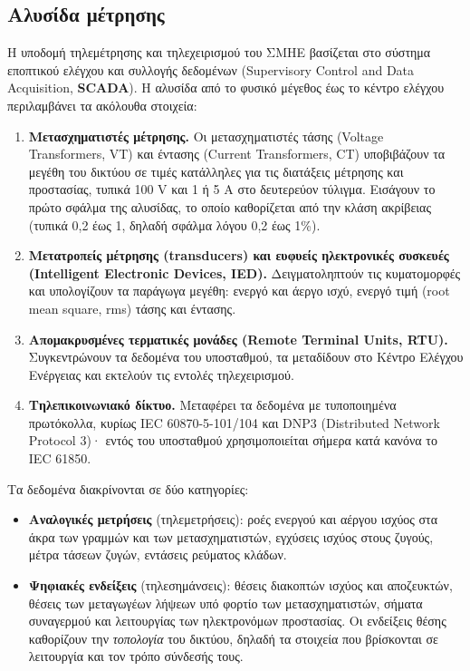 \subsection{Αλυσίδα μέτρησης}

Η υποδομή τηλεμέτρησης και τηλεχειρισμού του ΣΜΗΕ βασίζεται στο σύστημα εποπτικού ελέγχου
και συλλογής δεδομένων (Supervisory Control and Data Acquisition, \textbf{SCADA}). Η αλυσίδα
από το φυσικό μέγεθος έως το κέντρο ελέγχου περιλαμβάνει τα ακόλουθα στοιχεία:

\begin{enumerate}
\item \textbf{Μετασχηματιστές μέτρησης.} Οι μετασχηματιστές τάσης (Voltage Transformers, VT) και
      έντασης (Current Transformers, CT)
      υποβιβάζουν τα μεγέθη του δικτύου σε τιμές κατάλληλες για τις διατάξεις μέτρησης
      και προστασίας, τυπικά 100 V και 1 ή 5 A στο δευτερεύον τύλιγμα. Εισάγουν το πρώτο
      σφάλμα της αλυσίδας, το οποίο καθορίζεται από την κλάση ακρίβειας (τυπικά 0,2 έως 1,
      δηλαδή σφάλμα λόγου 0,2 έως 1\%).
\item \textbf{Μετατροπείς μέτρησης (transducers) και ευφυείς ηλεκτρονικές συσκευές (Intelligent
      Electronic Devices, IED).}
      Δειγματοληπτούν τις κυματομορφές και υπολογίζουν τα παράγωγα μεγέθη: ενεργό και
      άεργο ισχύ, ενεργό τιμή (root mean square, rms) τάσης και έντασης.
\item \textbf{Απομακρυσμένες τερματικές μονάδες (Remote Terminal Units, RTU).} Συγκεντρώνουν τα δεδομένα του
      υποσταθμού, τα μεταδίδουν στο Κέντρο Ελέγχου Ενέργειας και εκτελούν τις εντολές
      τηλεχειρισμού.
\item \textbf{Τηλεπικοινωνιακό δίκτυο.} Μεταφέρει τα δεδομένα με τυποποιημένα πρωτόκολλα,
      κυρίως IEC 60870-5-101/104 και DNP3 (Distributed Network Protocol 3)· εντός του υποσταθμού χρησιμοποιείται σήμερα
      κατά κανόνα το IEC 61850.
\end{enumerate}

Τα δεδομένα διακρίνονται σε δύο κατηγορίες:

\begin{itemize}
\item \textbf{Αναλογικές μετρήσεις} (τηλεμετρήσεις): ροές ενεργού και αέργου ισχύος στα
      άκρα των γραμμών και των μετασχηματιστών, εγχύσεις ισχύος στους ζυγούς, μέτρα τάσεων
      ζυγών, εντάσεις ρεύματος κλάδων.
\item \textbf{Ψηφιακές ενδείξεις} (τηλεσημάνσεις): θέσεις διακοπτών ισχύος και αποζευκτών,
      θέσεις των μεταγωγέων λήψεων υπό φορτίο των μετασχηματιστών, σήματα συναγερμού και
      λειτουργίας των ηλεκτρονόμων προστασίας. Οι ενδείξεις θέσης καθορίζουν την
      \emph{τοπολογία} του δικτύου, δηλαδή τα στοιχεία που βρίσκονται σε λειτουργία και τον
      τρόπο σύνδεσής τους.
\end{itemize}

